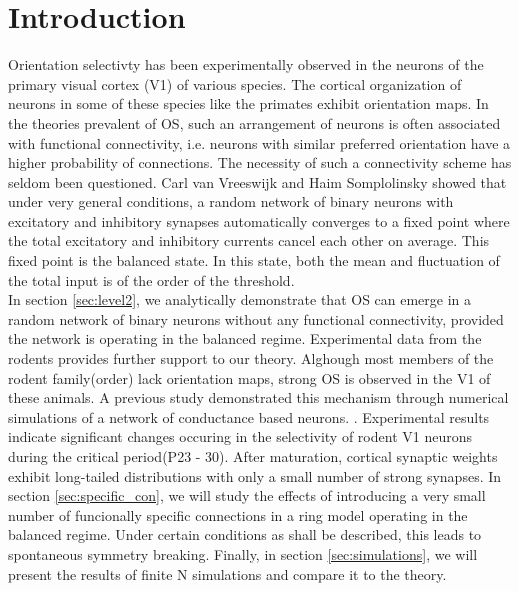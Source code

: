 \section{\label{sec:level1}Introduction}

Orientation selectivty has been experimentally observed in the neurons of the primary visual cortex (V1) of various species. The cortical organization of neurons in some of these species like the primates exhibit orientation maps. In the theories prevalent of OS, such an arrangement of neurons is often associated with functional connectivity, i.e. neurons with similar preferred orientation have a higher probability of connections. The necessity of such a connectivity scheme has seldom been questioned\@. 
Carl van Vreeswijk and Haim Somplolinsky \cite{} showed that  under very general conditions, a random network of binary neurons with excitatory and inhibitory synapses automatically converges to a fixed point where the total excitatory and inhibitory currents cancel each other on average. This fixed point is the balanced state. In this state, both the mean and fluctuation of the total input is of the order of the threshold\@. \\
In section \ref{sec:level2}, we analytically demonstrate that OS can emerge in a random network of binary neurons without any functional connectivity, provided the network is operating in the balanced regime. Experimental data from the rodents provides further support to our theory. Alghough most members of the rodent family(order) lack orientation maps, strong OS is observed in the V1 of these animals. A previous study demonstrated this mechanism through numerical simulations of a network of conductance based neurons. \cite{}\@. 
Experimental results indicate significant changes occuring in the selectivity of rodent V1 neurons during the critical period(P23 - 30). After maturation, cortical synaptic weights exhibit long-tailed distributions with only a small number of strong synapses. In section \ref{sec:specific_con}, we will study the effects of introducing a very small number of funcionally specific connections in a ring model operating in the balanced regime. Under certain conditions as shall be described, this leads to spontaneous symmetry breaking. Finally, in section \ref{sec:simulations}, we will present the results of finite N simulations and compare it to the theory. 
 

